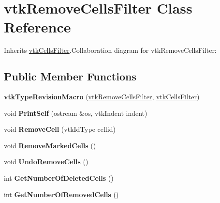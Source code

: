 \hypertarget{classvtkRemoveCellsFilter}{
\section{vtkRemoveCellsFilter Class Reference}
\label{classvtkRemoveCellsFilter}
}


Inherits \hyperlink{classvtkCellsFilter}{vtkCellsFilter}.Collaboration diagram for vtkRemoveCellsFilter:\subsection*{Public Member Functions}
\begin{DoxyCompactItemize}
\item 
\hypertarget{classvtkRemoveCellsFilter_a0f6ba71b8249357035033b119669ed3b}{
{\bfseries vtkTypeRevisionMacro} (\hyperlink{classvtkRemoveCellsFilter}{vtkRemoveCellsFilter}, \hyperlink{classvtkCellsFilter}{vtkCellsFilter})}
\label{classvtkRemoveCellsFilter_a0f6ba71b8249357035033b119669ed3b}

\item 
\hypertarget{classvtkRemoveCellsFilter_a21e8ea17142071f5d23b8b0c6dc3d26a}{
void {\bfseries PrintSelf} (ostream \&os, vtkIndent indent)}
\label{classvtkRemoveCellsFilter_a21e8ea17142071f5d23b8b0c6dc3d26a}

\item 
\hypertarget{classvtkRemoveCellsFilter_a3e105626c776e7f2663376d2cca201be}{
void {\bfseries RemoveCell} (vtkIdType cellid)}
\label{classvtkRemoveCellsFilter_a3e105626c776e7f2663376d2cca201be}

\item 
\hypertarget{classvtkRemoveCellsFilter_a258e1b946220dce9441d6347f1d480da}{
void {\bfseries RemoveMarkedCells} ()}
\label{classvtkRemoveCellsFilter_a258e1b946220dce9441d6347f1d480da}

\item 
\hypertarget{classvtkRemoveCellsFilter_ad8266a9585708cf16bded72da44052b6}{
void {\bfseries UndoRemoveCells} ()}
\label{classvtkRemoveCellsFilter_ad8266a9585708cf16bded72da44052b6}

\item 
\hypertarget{classvtkRemoveCellsFilter_a10f7f20e8c810446196271a661f11a34}{
int {\bfseries GetNumberOfDeletedCells} ()}
\label{classvtkRemoveCellsFilter_a10f7f20e8c810446196271a661f11a34}

\item 
\hypertarget{classvtkRemoveCellsFilter_a094a871b3da43b6037ac1ae3768067e0}{
int {\bfseries GetNumberOfRemovedCells} ()}
\label{classvtkRemoveCellsFilter_a094a871b3da43b6037ac1ae3768067e0}

\end{DoxyCompactItemize}
